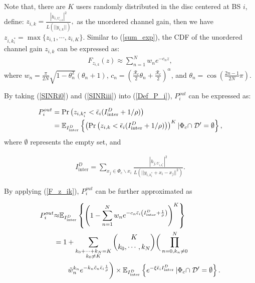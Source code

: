 \documentclass[10pt, doublecolumn]{IEEEtran}
\newcommand{\Equ}[1]{
  \begin{align}
    #1
  \end{align}}
\begin{document}
\begin{IEEEproof}
Note that, there are $K$ users randomly distributed in the disc centered at BS $i$, define:
$
 z_{i,k}=\frac{|h_{i,U_{i,k}}|^2}{L(||y_{i,k}||)},
$
as the unordered channel gain, then we have $z_{i,k_i^*}=\max\{z_{i,1},\cdots, z_{i,K}\}$. Similar to (\ref{sum_exp}), the CDF of the unordered channel gain $z_{i,k}$ can be expressed as:
\begin{align}\label{F_z_ik}
 F_{z_{i,k}}(z)\approx\sum_{n=1}^Nw_ne^{-c_nz},
\end{align}
where $w_n=\frac{\pi}{2N}\sqrt{1-\theta_n^2}(\theta_n+1)$, $c_n=\left(\frac{\mathcal{R}_c}{2}\theta_n+\frac{\mathcal{R}_c}{2}\right)^{\alpha}$, and $\theta_n=\cos\left(\frac{2n-1}{2N}\pi\right)$.

By taking (\ref{SINRi0}) and (\ref{SINRiii}) into (\ref{Def_P_i}), $P_{i}^{out}$ can be expressed as:
\Equ{
    P_{i}^{out}
    &=\text{Pr}\left(z_{i,k_i^*}<\bar{\epsilon}_i(I_{\text{inter}}^D+1/\rho)\right)\\\notag
    &=\mathbb{E}_{I_{\text{inter}}^D}
    \left\{\left(\text{Pr}\left(z_{i,k}<\bar{\epsilon}_i(I_{\text{inter}}^D+1/\rho)\right)\right)^K \left| \Phi_c\cap\right.\mathcal{D}'=\emptyset
\right\},
}
where $\emptyset$ represents the empty set, and
\Equ{
    I_{\text{inter}}^D=\sum\limits_{x_j \in \Phi_c\backslash x_i}\frac{|h_{j,U_{i,k_i^*}}|^2}{L(||y_{i,k_i^*}+x_i-x_j||^2)}.
}

By applying (\ref{F_z_ik}), $P_{i}^{out}$ can be further approximated as
\Equ{
    P_{i}^{out}
         &{\approx} {\mathbb{E}}_{I_{\text{inter}}^D }\left\{ \left(1-\sum^{N}_{n=1}w_n e^{-c_n\bar{\epsilon}_i\left(I_{\text{inter}}^D
         +\frac{1}{\rho}\right)}\right)^K \right\}\\\notag
         &= 1+\sum_{\substack{k_0+\cdots+k_N=K \\ k_0\neq K}}{K \choose k_0, \cdots, k_N} \bigg(\prod_{n=0,k_n\neq 0}^{N} \\\notag
         &\quad\quad\tilde{w}_n^{k_n} e^{-k_n\tilde{c}_n\bar{\epsilon}_i
    \frac{1}{\rho}}\bigg)\times{\mathbb{E}}_{I_{\text{inter}}^D } \left\{e^{-\xi\bar{\epsilon}_i  I_{\text{inter}}^D}\left| \Phi_c\cap\right.\mathcal{D}'=\emptyset\right\}.
}


\end{IEEEproof}
\end{document}
